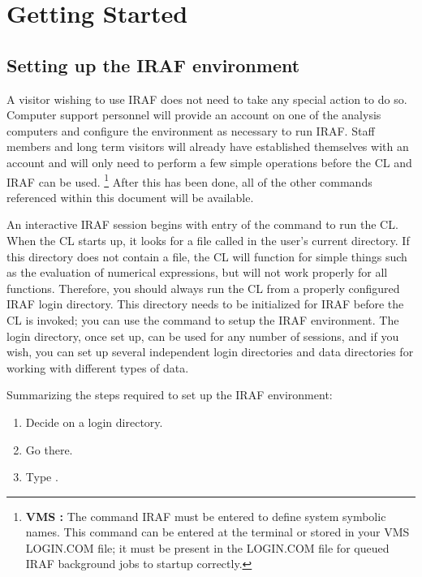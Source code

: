 \newpage
\section{Getting Started}
\subsection{Setting up the IRAF environment}

\ppind
A visitor wishing to use IRAF does not need to take any special
action to do so.
Computer support personnel will provide an account on one of the analysis 
computers and configure the environment as necessary to run IRAF.  
Staff members and long term visitors will already have established 
themselves with an account and will only need to perform a few simple 
operations before the CL and IRAF can be used. \footnote{ {\bf VMS :} The
command {\eighttt IRAF} must be entered to define system symbolic names.
This command can be entered at the terminal or stored in your VMS LOGIN.COM
file; it must be present in the LOGIN.COM file for queued IRAF background
jobs to startup correctly.}
After this has been done, all of the other
commands referenced within this document will be available.

An interactive IRAF session begins with entry of the command 
 to run the CL.
When the CL starts up, it looks for a file called  in the
user's current directory.  If this directory does not contain a 
 file, the CL will function for simple things
such as the evaluation of numerical expressions, but will not work 
properly for all functions.  Therefore, you should always run the CL 
from a properly configured IRAF login directory.  
This directory needs to be initialized for IRAF before the
CL is invoked; you can use the  command to setup the
IRAF environment.  The login directory, once set up, can be used for any number
of sessions, and if you wish, you can set up several independent login
directories and data directories for working with different types of data.

\noindent
Summarizing the steps required to set up the IRAF environment:

\begin{enumerate}
\item Decide on a login directory.
\item Go there.
\item Type .
\end{enumerate}

